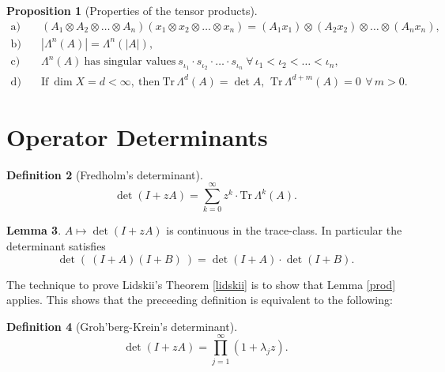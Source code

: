 \documentclass[a4paper, 10pt]{article}
\newcommand{\Tr}{\textrm{Tr}\,}
\theoremstyle{definition}
\newtheorem{definition}{Definition}[section]
\newtheorem{proposition}[definition]{Proposition}
\newtheorem{lemma}[definition]{Lemma}
\theoremstyle{remark}
\theoremstyle{remark}
\begin{document}
\begin{proposition}[Properties of the tensor products] 
    \begin{align}
        \text{a)} &\quad (A_1 \otimes A_2 \otimes \ldots \otimes A_n) (x_1 \otimes x_2 \otimes \ldots \otimes x_n) = (A_1 x_1) \otimes (A_2 x_2) \otimes \ldots \otimes (A_n x_n), \\
        \text{b)} &\quad | \Lambda^n (A) | = \Lambda^n (|A|), \\
        \text{c)} &\quad \Lambda^n (A)\ \text{has singular values}\ s_{\iota_1} \cdot s_{\iota_2} \cdot \ldots \cdot s_{\iota_n}\ \forall\, \iota_1 < \iota_2 < \ldots < \iota_n, \\
        \text{d)} &\quad \text{If}\ \dim X = d < \infty,\ \text{then}\ \Tr \Lambda^d (A) = \det A,\,\ \Tr \Lambda^{d+m} (A) = 0\,\ \forall\, m > 0. 
    \end{align}

\end{proposition}

\section{Operator Determinants}

\begin{definition}[Fredholm's determinant]
    \begin{equation}
        \det (I + z A) = \sum_{k=0}^{\infty} z^k \cdot \Tr \Lambda^k (A) . 
    \end{equation}
\end{definition}

\begin{lemma}
    $A \mapsto \det (I + z A)$ is continuous in  the trace-class. In particular the determinant satisfies
    \begin{equation}
        \det \left( \ (I + A) (I + B) \ \right) = \det (I + A) \cdot \det (I + B). 
    \end{equation}
\end{lemma}

The technique to prove Lidskii's Theorem \ref{lidskii} is to show that Lemma \ref{prod} applies. This shows that the preceeding definition is equivalent to the following: 

\begin{definition}[Groh'berg-Krein's determinant]
    \begin{equation}
        \det (I + z A) = \prod_{j=1}^{\infty} (1 + \lambda_j z) . 
    \end{equation}
\end{definition}


\end{document}
